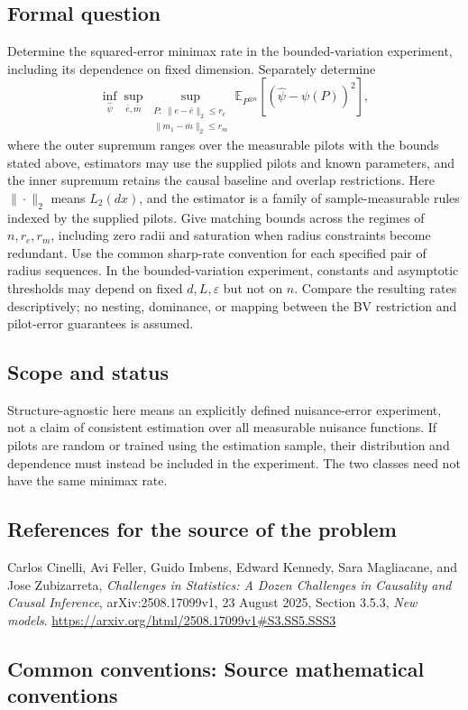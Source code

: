 \documentclass[11pt,a4paper]{article}
\newcommand{\E}{\mathbb E}
\begin{document}
\subsection*{Formal question}
Determine the squared-error minimax rate in the bounded-variation experiment, including its dependence on fixed dimension. Separately determine
\[
 \inf_{\widehat\psi}\sup_{\bar e,\bar m}
 \sup_{\substack{P:\ \|e-\bar e\|_2\leq r_e\\
                         \|m_1-\bar m\|_2\leq r_m}}
 \E_{P^{\otimes n}}[(\widehat\psi-\psi(P))^2],
\]
where the outer supremum ranges over the measurable pilots with the bounds stated above, estimators may use the supplied pilots and known parameters, and the inner supremum retains the causal baseline and overlap restrictions. Here $\|\cdot\|_2$ means $L_2(dx)$, and the estimator is a family of sample-measurable rules indexed by the supplied pilots. Give matching bounds across the regimes of $n,r_e,r_m$, including zero radii and saturation when radius constraints become redundant. Use the common sharp-rate convention for each specified pair of radius sequences. In the bounded-variation experiment, constants and asymptotic thresholds may depend on fixed $d,L,\varepsilon$ but not on $n$. Compare the resulting rates descriptively; no nesting, dominance, or mapping between the BV restriction and pilot-error guarantees is assumed.
\subsection*{Scope and status}
Structure-agnostic here means an explicitly defined nuisance-error experiment, not a claim of consistent estimation over all measurable nuisance functions. If pilots are random or trained using the estimation sample, their distribution and dependence must instead be included in the experiment. The two classes need not have the same minimax rate.
\subsection*{References for the source of the problem}
Carlos Cinelli, Avi Feller, Guido Imbens, Edward Kennedy, Sara Magliacane, and Jose Zubizarreta, \emph{Challenges in Statistics: A Dozen Challenges in Causality and Causal Inference}, arXiv:2508.17099v1, 23 August 2025, Section 3.5.3, \emph{New models}.
\url{https://arxiv.org/html/2508.17099v1#S3.SS5.SSS3}

\subsection*{Common conventions: Source mathematical conventions}
\end{document}
